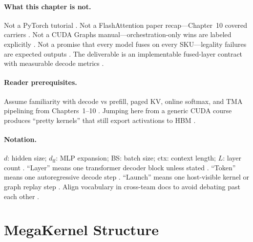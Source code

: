 \paragraph{What this chapter is not.} Not a PyTorch tutorial \citep{dlbook}. Not a FlashAttention paper recap---Chapter~10 covered carriers \citep{dao2022flashattention}. Not a CUDA Graphs manual---orchestration-only wins are labeled explicitly \citep{memoryfloor2026,nvidia2024cudagraphs}. Not a promise that every model fuses on every SKU---legality failures are expected outputs \citep{amd2024aie,yirage2026}. The deliverable is an implementable fused-layer contract with measurable decode metrics \citep{taxbreak2026,patel2025llminference,chen2020compilerbasedhardw}.

\paragraph{Reader prerequisites.} Assume familiarity with decode vs prefill, paged KV, online softmax, and TMA pipelining from Chapters~1--10 \citep{kwon2023vllm,dao2022flashattention,semianalysis2024tma,memoryfloor2026}. Jumping here from a generic CUDA course produces ``pretty kernels'' that still export activations to HBM \citep{taxbreak2026,yirage2026}.

\paragraph{Notation.} $d$: hidden size; $d_{\mathrm{ff}}$: MLP expansion; BS: batch size; ctx: context length; $L$: layer count \citep{dlbook,patel2025llminference}. ``Layer'' means one transformer decoder block unless stated \citep{liu2024deepseekv3,kwon2023vllm}. ``Token'' means one autoregressive decode step \citep{dao2023flashdecoding,taxbreak2026}. ``Launch'' means one host-visible kernel or graph replay step \citep{nvidia2024cudagraphs,memoryfloor2026}. Align vocabulary in cross-team docs to avoid debating past each other \citep{yirage2026,chen2020compilerbasedhardw,amd2024aie,amd2024xdna,semianalysis2024tma,dao2022flashattention,liu2024deepseekv3}.

\section{MegaKernel Structure}
\label{sec:ch11_megakernel_structure}

